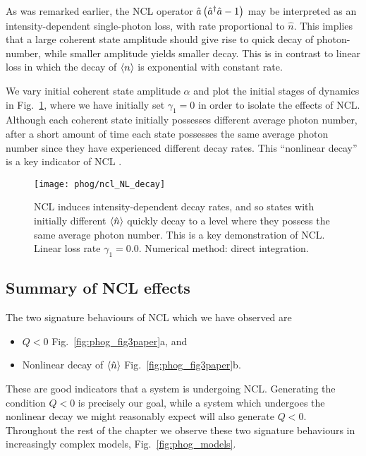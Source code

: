 As was remarked earlier, the NCL operator $\hat{a}\left(\hat{a}^\dagger \hat{a} - 1\right)$ may be interpreted as an intensity-dependent single-photon loss, with rate proportional to $\hat{n}$. This implies that a large coherent state amplitude should give rise to quick decay of photon-number, while smaller amplitude yields smaller decay. This is in contrast to linear loss in which the decay of $\ev{n}$ is exponential with constant rate.

We vary initial coherent state amplitude $\alpha$ and plot the initial stages of dynamics in Fig.~\ref{fig:phog_ncl_NL_decay}, where we have initially set $\gamma_1=0$ in order to isolate the effects of NCL. Although each coherent state initially possesses different average photon number, after a short amount of time each state possesses the same average photon number since they have experienced different decay rates. This ``nonlinear decay'' is a key indicator of NCL \cite{Mogilevtsev2010, Shchesnovich2011}.

\begin{figure}[htp]
\captionsetup{width=0.8\linewidth}
\centering
\texttt{[image: phog/ncl\_NL\_decay]}
\caption{\label{fig:phog_ncl_NL_decay} NCL induces intensity-dependent decay rates, and so states with initially different $\ev{\hat{n}}$ quickly decay to a level where they possess the same average photon number. This is a key demonstration of NCL. Linear loss rate $\gamma_1 = 0.0$. Numerical method: direct integration.}
\end{figure}

\FloatBarrier
\subsection{Summary of NCL effects}\label{sec:phog_summary_ncl_effects}
The two signature behaviours of NCL which we have observed are
\begin{itemize}
\item $Q < 0$ Fig.~\ref{fig:phog_fig3paper}a, and 
\item Nonlinear decay of $\ev{\hat{n}}$ Fig.~\ref{fig:phog_fig3paper}b.
\end{itemize}
These are good indicators that a system is undergoing NCL. Generating the condition $Q<0$ is precisely our goal, while a system which undergoes the nonlinear decay we might reasonably expect will also generate $Q<0$. Throughout the rest of the chapter we observe these two signature behaviours in increasingly complex models, Fig.~\ref{fig:phog_models}.

